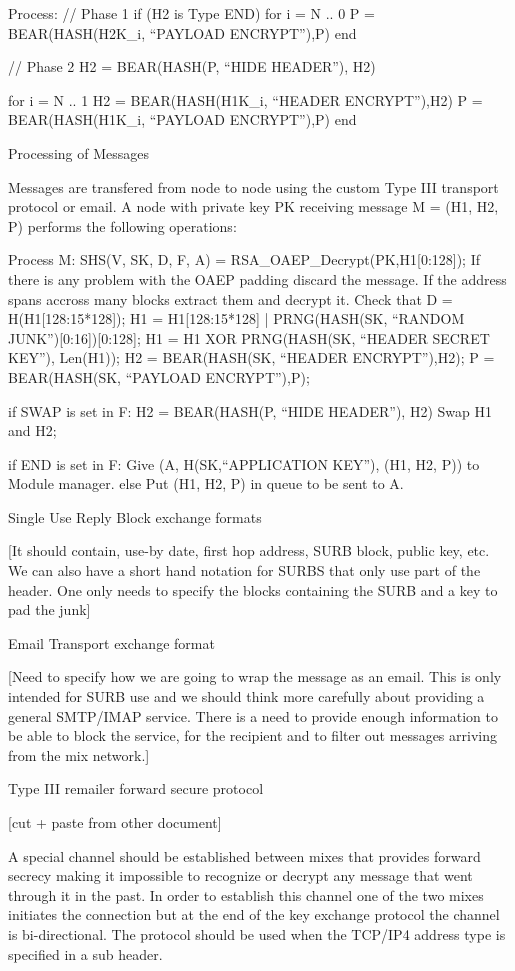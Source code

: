 Process:
	// Phase 1
	if (H2 is Type END)
		for i = N .. 0
			P = BEAR(HASH(H2K_i, ``PAYLOAD ENCRYPT''),P)
		end

	// Phase 2
	H2 = BEAR(HASH(P, ``HIDE HEADER''), H2)

	for i = N .. 1
		H2 = BEAR(HASH(H1K_i, ``HEADER ENCRYPT''),H2)
		P = BEAR(HASH(H1K_i, ``PAYLOAD ENCRYPT''),P)
	end

Processing of Messages

Messages are transfered from node to node using the custom Type III
transport protocol or email. A node with private key PK receiving
message M = (H1, H2, P) performs the following operations:

Process M:
	SHS(V, SK, D, F, A) = RSA_OAEP_Decrypt(PK,H1[0:128]);
	If there is any problem with the OAEP padding discard the message.
	If the address spans accross many blocks extract them and
		decrypt it.
	Check that D = H(H1[128:15*128]);
	H1 = H1[128:15*128] | PRNG(HASH(SK, ``RANDOM
						JUNK'')[0:16])[0:128];
	H1 = H1 XOR PRNG(HASH(SK, ``HEADER SECRET KEY''), Len(H1));
	H2 = BEAR(HASH(SK, ``HEADER ENCRYPT''),H2);
	P = BEAR(HASH(SK, ``PAYLOAD ENCRYPT''),P);

	if SWAP is set in F:
		H2 = BEAR(HASH(P, ``HIDE HEADER''), H2)
		Swap H1 and H2;

	if END is set in F:
		Give (A, H(SK,``APPLICATION KEY''), (H1, H2, P)) to
		Module manager. 
	else
	   	Put (H1, H2, P) in queue to be sent to A.

Single Use Reply Block exchange formats

[It should contain, use-by date, first hop address, 
 SURB block, public key, etc.
 We can also have a short hand notation for SURBS that only
 use part of the header. One only needs to specify the 
 blocks containing the SURB and a key to pad the junk]

Email Transport exchange format

[Need to specify how we are going to wrap the message
 as an email. This is only intended for SURB use and
 we should think more carefully about providing a 
 general SMTP/IMAP service.
 There is a need to provide enough information to be 
 able to block the service, for the recipient and to
 filter out messages arriving from the mix network.]

Type III remailer forward secure protocol

[cut + paste from other document]

A special channel should be established between mixes that provides
forward secrecy making it impossible to recognize or decrypt any
message that went through it in the past. In order to establish this
channel one of the two mixes initiates the connection but at the end
of the key exchange protocol the channel is bi-directional. The
protocol should be used when the TCP/IP4 address type is specified in
a sub header.

